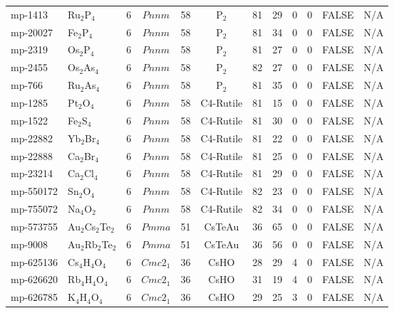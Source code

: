 {\begin{longtable}{llcccccccccc}
    mp-1413 & Ru$_{2}$P$_{4}$ & 6     & $Pnnm$ & 58    & P$_{2}$ & 81    & 29    & 0     & 0     & FALSE & N/A \\
    mp-20027 & Fe$_{2}$P$_{4}$ & 6     & $Pnnm$ & 58    & P$_{2}$ & 81    & 34    & 0     & 0     & FALSE & N/A \\
    mp-2319 & Os$_{2}$P$_{4}$ & 6     & $Pnnm$ & 58    & P$_{2}$ & 81    & 27    & 0     & 0     & FALSE & N/A \\
    mp-2455 & Os$_{2}$As$_{4}$ & 6     & $Pnnm$ & 58    & P$_{2}$ & 82    & 27    & 0     & 0     & FALSE & N/A \\
    mp-766 & Ru$_{2}$As$_{4}$ & 6     & $Pnnm$ & 58    & P$_{2}$ & 81    & 35    & 0     & 0     & FALSE & N/A \\
    mp-1285 & Pt$_{2}$O$_{4}$ & 6     & $Pnnm$ & 58    & C4-Rutile & 81    & 15    & 0     & 0     & FALSE & N/A \\
    mp-1522 & Fe$_{2}$S$_{4}$ & 6     & $Pnnm$ & 58    & C4-Rutile & 81    & 30    & 0     & 0     & FALSE & N/A \\
    mp-22882 & Yb$_{2}$Br$_{4}$ & 6     & $Pnnm$ & 58    & C4-Rutile & 81    & 22    & 0     & 0     & FALSE & N/A \\
    mp-22888 & Ca$_{2}$Br$_{4}$ & 6     & $Pnnm$ & 58    & C4-Rutile & 81    & 25    & 0     & 0     & FALSE & N/A \\
    mp-23214 & Ca$_{2}$Cl$_{4}$ & 6     & $Pnnm$ & 58    & C4-Rutile & 81    & 29    & 0     & 0     & FALSE & N/A \\
    mp-550172 & Sn$_{2}$O$_{4}$ & 6     & $Pnnm$ & 58    & C4-Rutile & 82    & 23    & 0     & 0     & FALSE & N/A \\
    mp-755072 & Na$_{4}$O$_{2}$ & 6     & $Pnnm$ & 58    & C4-Rutile & 82    & 34    & 0     & 0     & FALSE & N/A \\
    mp-573755 & Au$_{2}$Cs$_{2}$Te$_{2}$ & 6     & $Pmma$ & 51    & CsTeAu & 36    & 65    & 0     & 0     & FALSE & N/A \\
    mp-9008 & Au$_{2}$Rb$_{2}$Te$_{2}$ & 6     & $Pmma$ & 51    & CsTeAu & 36    & 56    & 0     & 0     & FALSE & N/A \\
    mp-625136 & Cs$_{4}$H$_{4}$O$_{4}$ & 6     & $Cmc2_1$ & 36    & CsHO  & 28    & 29    & 4     & 0     & FALSE & N/A \\
    mp-626620 & Rb$_{4}$H$_{4}$O$_{4}$ & 6     & $Cmc2_1$ & 36    & CsHO  & 31    & 19    & 4     & 0     & FALSE & N/A \\
    mp-626785 & K$_{4}$H$_{4}$O$_{4}$ & 6     & $Cmc2_1$ & 36    & CsHO  & 29    & 25    & 3     & 0     & FALSE & N/A \\

\end{longtable}}
